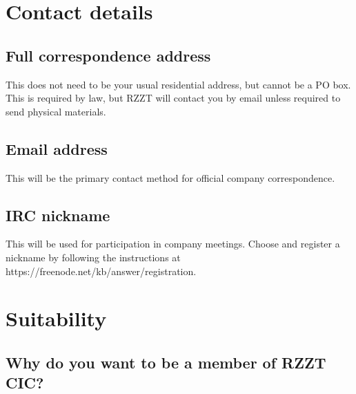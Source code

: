 \documentclass[a4paper,10pt]{article}
\begin{document}
\begin{Form}
\section{Contact details}

\subsection{Full correspondence address}

This does not need to be your usual residential address, but cannot be a PO box. This is required by law, but RZZT will contact you by email unless required to send physical materials.

\begin{framed}%
  \TextField[width=\textwidth,donotscroll=true,multiline=true,name=address]{ }%
\end{framed}%

\subsection{Email address}

This will be the primary contact method for official company correspondence.

\begin{framed}%
  \TextField[width=\textwidth,donotscroll=true,name=email]{ }%
\end{framed}%

\subsection{IRC nickname}

This will be used for participation in company meetings. Choose and register a nickname by following the instructions at https://freenode.net/kb/answer/registration.

\begin{framed}%
  \TextField[width=\textwidth,donotscroll=true,name=ircnick]{ }%
\end{framed}%

\section{Suitability}

\subsection{Why do you want to be a member of RZZT CIC?}


\end{Form}
\end{document}
